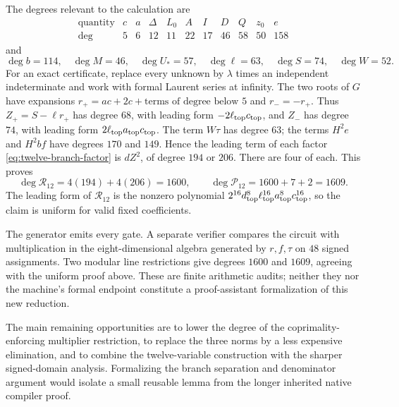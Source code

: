 The degrees relevant to the calculation are
\[
\begin{array}{c|rrrrrrrrrr}
 \text{quantity}&c&a&\Delta&L_0&A&I&D&Q&z_0&e\\ \hline
 \deg&5&6&12&11&22&17&46&58&50&158
\end{array}
\]
and
\[
 \deg b=114,\quad\deg M=46,\quad\deg U_*=57,\quad
 \deg\ell=63,\quad\deg S=74,\quad\deg W=52.
\]
For an exact certificate, replace every unknown by $\lambda$ times
an independent indeterminate and work with formal Laurent series at
infinity.  The two roots of $G$ have expansions
$r_+=ac+2c+\text{terms of degree below }5$ and $r_-=-r_+$.
Thus $Z_+=S-\ell r_+$ has degree $68$, with leading form
$-2\ell_{\rm top}c_{\rm top}$, and $Z_-$ has degree $74$, with
leading form $2\ell_{\rm top}a_{\rm top}c_{\rm top}$.
The term $W\tau$ has degree $63$; the terms $H^2e$ and $H^2bf$
have degrees $170$ and $149$.  Hence the leading term of each factor
\eqref{eq:twelve-branch-factor} is $dZ^2$, of degree $194$ or $206$.
There are four of each.  This proves
\[
 \deg\mathcal R_{12}=4(194)+4(206)=1600,
 \qquad\deg\mathcal P_{12}=1600+7+2=1609.
\]
The leading form of $\mathcal R_{12}$ is the nonzero polynomial
$2^{16}d_{\rm top}^{8}\ell_{\rm top}^{16}
a_{\rm top}^{8}c_{\rm top}^{16}$, so the claim is uniform for valid
fixed coefficients.

The generator emits every gate.  A separate verifier compares the circuit
with multiplication in the eight-dimensional algebra generated by
$r,f,\tau$ on $48$ signed assignments.  Two modular line restrictions
give degrees $1600$ and $1609$, agreeing with the uniform proof above.
These are finite arithmetic audits; neither they nor the machine's formal
endpoint constitute a proof-assistant formalization of this new reduction.

The main remaining opportunities are to lower the degree of the
coprimality-enforcing multiplier restriction, to replace the three norms
by a less expensive elimination, and to combine the twelve-variable
construction with the sharper signed-domain analysis.  Formalizing the
branch separation and denominator argument would isolate a small reusable
lemma from the longer inherited native compiler proof.
